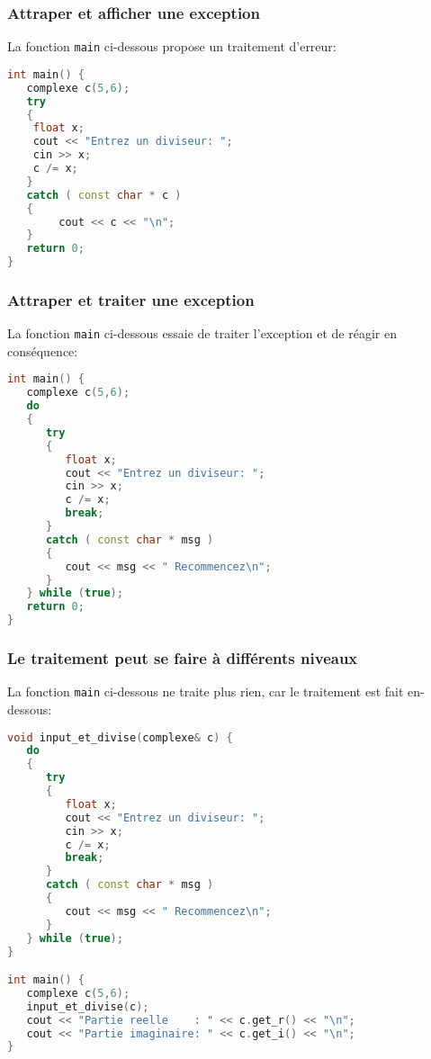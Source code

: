 \documentclass{beamer}
\begin{document}
\begin{frame}[fragile=singleslide,shrink=20]
\frametitle {Attraper et afficher une exception}

La fonction \texttt{main} ci-dessous propose un traitement d'erreur:
\begin{lstlisting}[language=c++]
int main() {
   complexe c(5,6);
   try
   {
   	float x;
   	cout << "Entrez un diviseur: ";
    cin >> x;
    c /= x;
   }
   catch ( const char * c )
   {
    	cout << c << "\n";
   }
   return 0;
}
\end{lstlisting}
\end{frame}

\begin{frame}[fragile=singleslide,shrink=20]
\frametitle {Attraper et traiter une exception}

La fonction \texttt{main} ci-dessous essaie de traiter l'exception et de réagir en conséquence:
\begin{lstlisting}[language=c++]
int main() {
   complexe c(5,6);
   do
   {
      try
      {
         float x;
         cout << "Entrez un diviseur: ";
         cin >> x;
         c /= x;
         break;
      }
      catch ( const char * msg )
      {
         cout << msg << " Recommencez\n";
      }
   } while (true);
   return 0;
}
\end{lstlisting}
\end{frame}

\begin{frame}[fragile=singleslide,shrink=20]
\frametitle {Le traitement peut se faire à différents niveaux}

La fonction \texttt{main} ci-dessous ne traite plus rien, car le traitement est fait en-dessous:
\begin{lstlisting}[language=c++]
void input_et_divise(complexe& c) {
   do
   {
      try
      {
         float x;
         cout << "Entrez un diviseur: ";
         cin >> x;
         c /= x;
         break;
      }
      catch ( const char * msg )
      {
         cout << msg << " Recommencez\n";
      }
   } while (true);
}

int main() {
   complexe c(5,6);
   input_et_divise(c);
   cout << "Partie reelle    : " << c.get_r() << "\n";
   cout << "Partie imaginaire: " << c.get_i() << "\n";
}
\end{lstlisting}
\end{frame}
\end{document}
